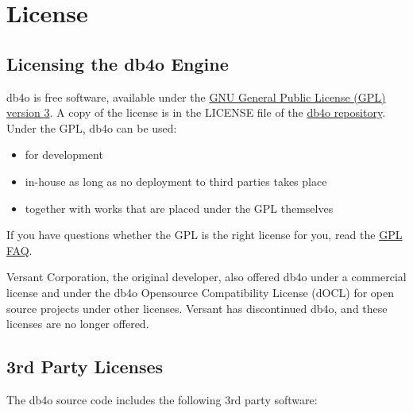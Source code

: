 
\chapter{License}
\label{ref:license}

\section*{Licensing the db4o Engine}

db4o is free software, available under the \href{https://www.gnu.org/licenses/gpl-3.0.html}{GNU General Public License (GPL) version 3}. A copy of the license is in the LICENSE file of the \href{https://github.com/blakemcbride/db4o}{db4o repository}. Under the GPL, db4o can be used:

\begin{itemize}
\item for development
\item in-house as long as no deployment to third parties takes place
\item together with works that are placed under the GPL themselves
\end{itemize}

If you have questions whether the GPL is the right license for you, read the \href{https://www.gnu.org/licenses/gpl-faq.html}{GPL FAQ}.

Versant Corporation, the original developer, also offered db4o under a commercial license and under the db4o Opensource Compatibility License (dOCL) for open source projects under other licenses. Versant has discontinued db4o, and these licenses are no longer offered.

\section*{3rd Party Licenses}

The db4o source code includes the following 3rd party software:

